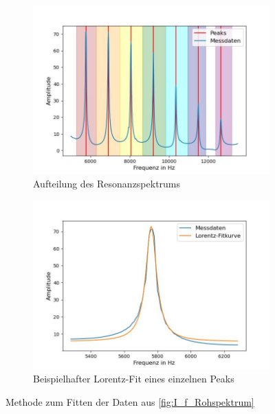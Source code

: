 \documentclass[../main.tex]{subfiles}
\begin{document}
        \begin{figure}[H]
            \centering
            \begin{subfigure}[b]{0.8\textwidth}
                \centering
                \includegraphics[width=\textwidth]{Bilddateien/Auswertung/I_f_LorentzfitVorbereitung.jpg}
                \caption{Aufteilung des Resonanzspektrums}
            \end{subfigure}
            \hfill
            \begin{subfigure}[b]{0.8\textwidth}
                \centering
                \includegraphics[width=\textwidth]{Bilddateien/Auswertung/I_f_LorentzfitBeispiel.jpg}
                \caption{Beispielhafter Lorentz-Fit eines einzelnen Peaks}
            \end{subfigure}
            \caption{Methode zum Fitten der Daten aus \ref{fig:I_f_Rohspektrum}}
            \label{fig:I_LorentzfitVorbereitung}
       \end{figure}
\end{document}
